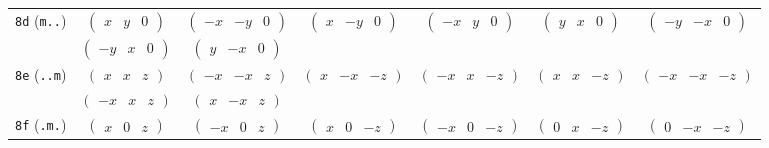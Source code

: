 \documentclass[fleqn,9pt,landscape]{jsarticle}
\begin{document}
\begin{center}
\begin{longtable}{ccccccc}
{\tt 8d} ({\tt m..}) & $ \begin{pmatrix} x & y & 0 \end{pmatrix} $ & $ \begin{pmatrix} - x & - y & 0 \end{pmatrix} $ & $ \begin{pmatrix} x & - y & 0 \end{pmatrix} $ & $ \begin{pmatrix} - x & y & 0 \end{pmatrix} $ & $ \begin{pmatrix} y & x & 0 \end{pmatrix} $ & $ \begin{pmatrix} - y & - x & 0 \end{pmatrix} $ \\
& $ \begin{pmatrix} - y & x & 0 \end{pmatrix} $ & $ \begin{pmatrix} y & - x & 0 \end{pmatrix} $ & $  $ & $  $ & $  $ & $  $ \\ \hline
{\tt 8e} ({\tt ..m}) & $ \begin{pmatrix} x & x & z \end{pmatrix} $ & $ \begin{pmatrix} - x & - x & z \end{pmatrix} $ & $ \begin{pmatrix} x & - x & - z \end{pmatrix} $ & $ \begin{pmatrix} - x & x & - z \end{pmatrix} $ & $ \begin{pmatrix} x & x & - z \end{pmatrix} $ & $ \begin{pmatrix} - x & - x & - z \end{pmatrix} $ \\
& $ \begin{pmatrix} - x & x & z \end{pmatrix} $ & $ \begin{pmatrix} x & - x & z \end{pmatrix} $ & $  $ & $  $ & $  $ & $  $ \\ \hline
{\tt 8f} ({\tt .m.}) & $ \begin{pmatrix} x & 0 & z \end{pmatrix} $ & $ \begin{pmatrix} - x & 0 & z \end{pmatrix} $ & $ \begin{pmatrix} x & 0 & - z \end{pmatrix} $ & $ \begin{pmatrix} - x & 0 & - z \end{pmatrix} $ & $ \begin{pmatrix} 0 & x & - z \end{pmatrix} $ & $ \begin{pmatrix} 0 & - x & - z \end{pmatrix} $ \\

\end{longtable}
\end{center}
\end{document}
